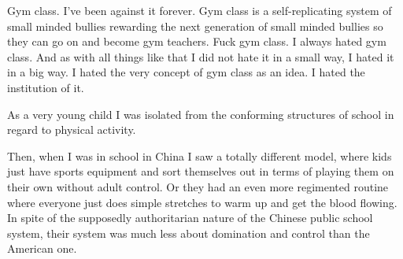 Gym class. I've been against it forever.  Gym class is a self-replicating system of small minded bullies rewarding the next generation of small minded bullies so they can go on and become gym teachers.  Fuck gym class.   I always hated gym class.  And as with all things like that I did not hate it in a small way, I hated it in a big way.  I hated the very concept of gym class as an idea.  I hated the institution of it.  

As a very young child I was isolated from the conforming structures of school in regard to physical activity.

Then, when I was in school in China I saw a totally different model, where kids just have sports equipment and sort themselves out in terms of playing them on their own without adult control.  Or they had an even more regimented routine where everyone just does simple stretches to warm up and get the blood flowing.  In spite of the supposedly authoritarian nature of the Chinese public school system, their system was much less about domination and control than the American one.   
